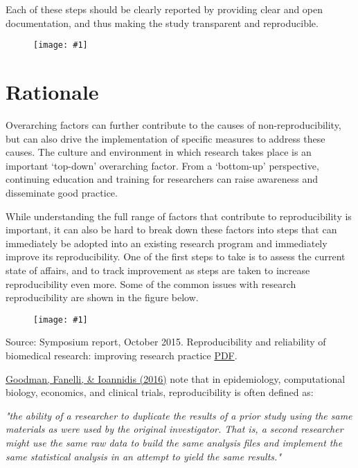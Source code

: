\documentclass{article}
\newlength{\imgwidth}
\newcommand\scaledgraphics[2]{%
                
\settowidth{\imgwidth}{\texttt{[image: \#1]}}%
                
\setlength{\imgwidth}{\minof{\imgwidth}{#2\textwidth}}%
                
\texttt{[image: \#1]}%
                
}
\begin{document}
Each of these steps should be clearly reported by providing clear and open documentation, and thus making the study transparent and reproducible.

\begin{figure}
\scaledgraphics{cd488cd3-09d0-48ea-a508-f6e5c12cf790.png}{1}
\label{F5873201}
\end{figure}


\section{Rationale}\label{rationale}



Overarching factors can further contribute to the causes of non-reproducibility, but can also drive the implementation of specific measures to address these causes. The culture and environment in which research takes place is an important ‘top-down’ overarching factor. From a ‘bottom-up’ perspective, continuing education and training for researchers can raise awareness and disseminate good practice.


While understanding the full range of factors that contribute to reproducibility is important, it can also be hard to break down these factors into steps that can immediately be adopted into an existing research program and immediately improve its reproducibility. One of the first steps to take is to assess the current state of affairs, and to track improvement as steps are taken to increase reproducibility even more. Some of the common issues with research reproducibility are shown in the figure below.

\begin{figure}
\scaledgraphics{651cc2af-b56a-42e6-b9e2-b072205db6ce.png}{1}
\label{F27553871}
\end{figure}


Source: Symposium report, October 2015. Reproducibility and reliability of biomedical research: improving research practice \href{https://acmedsci.ac.uk/viewFile/56314e40aac61.pdf}{PDF}.


\href{https://doi.org/10/gc5sjs}{Goodman, Fanelli, \& Ioannidis (2016)} note that in epidemiology, computational biology, economics, and clinical trials, reproducibility is often defined as:


\emph{"the ability of a researcher to duplicate the results of a prior study using the same materials as were used by the original investigator. That is, a second researcher might use the same raw data to build the same analysis files and implement the same statistical analysis in an attempt to yield the same results."}
\end{document}
